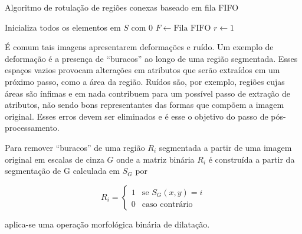 \begin{espacosimples}
\begin{algorithm2e}[H]
  \caption{Algoritmo de rotulação de regiões conexas baseado em fila FIFO}
  \label{algo:conexo}
  \SetAlgoLined

  Inicializa todos os elementos em $S$ com $0$\;
  $F \gets \text{Fila FIFO}$\;
  $r \gets 1$\;


\end{algorithm2e}
\end{espacosimples}

\vspace{1.0cm}

É comum tais imagens apresentarem deformações e ruído. Um exemplo de deformação
é a presença de ``buracos'' ao longo de uma região segmentada. Esses espaços
vazios provocam alterações em atributos que serão extraídos em um próximo passo,
como a área da região. Ruídos são, por exemplo, regiões cujas áreas
são ínfimas e em nada contribuem para um possível passo de extração de atributos,
não sendo bons representantes das formas que compõem a imagem original. Esses
erros devem ser eliminados e é esse o objetivo do passo de pós-processamento.

Para remover ``buracos'' de uma região $R_i$ segmentada a partir de uma imagem
original em escalas de cinza $G$ onde a matriz binária $R_i$ é construída a
partir da segmentação de G calculada em $S_G$ por

\begin{equation}
  R_i = 
  \begin{cases}
    1 & \text{se $S_G(x,y) = i$} \\
    0 & \text{caso contrário}
  \end{cases}
\end{equation}

\noindent aplica-se uma operação morfológica binária de dilatação.


